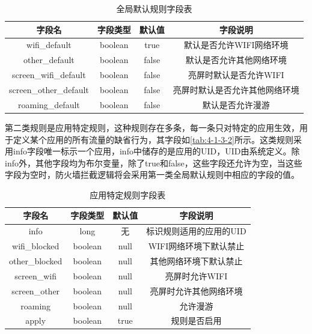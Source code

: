 \documentclass[format=final, language=chinese, degree=fyp]{hustthesis}
\begin{document}
\begin{table}[h!]
	\centering
	\caption{全局默认规则字段表}\label{tab:4-1-3-1}
	\begin{tabular}{|c|c|c|c|}
		\hline
		字段名					&	字段类型		&	默认值	&	字段说明 \\\hline
		wifi\_default			& 	boolean 		& 	true	&	默认是否允许WIFI网络环境\\\hline
		other\_default 			& 	boolean 		& 	false	& 	默认是否允许其他网络环境\\\hline
		screen\_wifi\_default 		& 	boolean 		& 	false	&	亮屏时默认是否允许WIFI\\\hline
		screen\_other\_default 	& 	boolean 		& 	false	&	亮屏时默认是否允许其他网络环境\\\hline
		roaming\_default 			& 	boolean 		& 	false	&	默认是否允许漫游\\\hline
	\end{tabular}
\end{table}

第二类规则是应用特定规则，这种规则存在多条，每一条只对特定的应用生效，用于定义某个应用的所有流量的缺省行为，其字段如\autoref{tab:4-1-3-2}所示。这类规则采用info字段唯一标示一个应用，info中储存的是应用的UID，UID由系统定义。除info外，其他字段均为布尔变量，除了true和false，这些字段还允许为空，当这些字段为空时，防火墙拦截逻辑将会采用第一类全局默认规则中相应的字段的值。

\begin{table}[h!]
	\centering
	\caption{应用特定规则字段表}\label{tab:4-1-3-2}
	\begin{tabular}{|c|c|c|c|}
		\hline
		字段名			&	字段类型		&	默认值	&	字段说明 \\\hline
		info			&	long 		&	无		&	标识规则适用的应用的UID\\\hline
		wifi\_blocked	& 	boolean 		& 	null		&	WIFI网络环境下默认禁止\\\hline
		other\_blocked 	& 	boolean 		& 	null		& 	其他网络环境下默认禁止\\\hline
		screen\_wifi 	& 	boolean 		& 	null		&	亮屏时允许WIFI\\\hline
		screen\_other 	& 	boolean 		& 	null		&	亮屏时允许其他网络环境\\\hline
		roaming 		& 	boolean 		& 	null		&	允许漫游\\\hline
		apply	 		& 	boolean 		& 	true		&	规则是否启用\\\hline
	\end{tabular}
\end{table}
\end{document}
